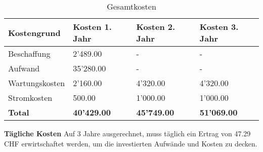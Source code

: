 \begin{table}[H]
\centering
\begin{tabular}{p{4cm}p{4cm}p{4cm}p{4cm}}
\hline
\rowcolor{heading} \textbf{Kostengrund} & \hfill \textbf{Kosten 1. Jahr} & \hfill\textbf{Kosten 2. Jahr} & \hfill \textbf{Kosten 3. Jahr}\\\hline
Beschaffung & \hfill 2'489.00 &\hfill - &\hfill - \\\hline
Aufwand & \hfill 35'280.00 & \hfill- & \hfill- \\\hline
Wartungskosten & \hfill 2'160.00 & \hfill 4'320.00 & \hfill 4'320.00 \\\hline
Stromkosten & \hfill 500.00 & \hfill 1'000.00 & \hfill 1'000.00 \\\hline
\rowcolor{subheading}\textbf{Total} & \hfill \textbf{40'429.00} & \hfill \textbf{45'749.00} & \hfill \textbf{51'069.00} \\\hline
\end{tabular}
\caption{Gesamtkosten}
\end{table}

\textbf{Tägliche Kosten}\newline
Auf 3 Jahre ausgerechnet, muss täglich ein Ertrag von 47.29 CHF erwirtschaftet werden, um die investierten Aufwände und Kosten zu decken.

